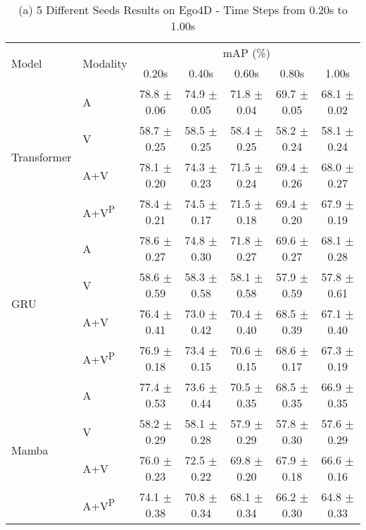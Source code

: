 \begin{table*}[t]
\centering
\footnotesize

\begin{subtable}{\textwidth}
\centering
\begin{adjustbox}{width=\textwidth, center}
\begin{tabular}{llccccc}
\toprule
\multirow{2}{*}{Model} & \multirow{2}{*}{Modality} & \multicolumn{5}{c}{mAP (\%)} \\
\cmidrule(lr){3-7}
 & & 0.20s & 0.40s & 0.60s & 0.80s & 1.00s \\
\midrule
\multirow{4}{*}{\centering Transformer} 
 & A & 78.8 $\pm$ 0.06 & 74.9 $\pm$ 0.05 & 71.8 $\pm$ 0.04 & 69.7 $\pm$ 0.05 & 68.1 $\pm$ 0.02 
 \\
 & V & 58.7 $\pm$ 0.25 & 58.5 $\pm$ 0.25 & 58.4 $\pm$ 0.25 & 58.2 $\pm$ 0.24 & 58.1 $\pm$ 0.24 
 \\
 & A+V & 78.1 $\pm$ 0.20 & 74.3 $\pm$ 0.23 & 71.5 $\pm$ 0.24 & 69.4 $\pm$ 0.26 & 68.0 $\pm$ 0.27 
 \\
 & A+V\textsuperscript{P} & 78.4 $\pm$ 0.21 & 74.5 $\pm$ 0.17 & 71.5 $\pm$ 0.18 & 69.4 $\pm$ 0.20 & 67.9 $\pm$ 0.19 
 \\
\midrule
\multirow{4}{*}{\centering GRU} 
 & A & 78.6 $\pm$ 0.27 & 74.8 $\pm$ 0.30 & 71.8 $\pm$ 0.27 & 69.6 $\pm$ 0.27 & 68.1 $\pm$ 0.28 
 \\
 & V & 58.6 $\pm$ 0.59 & 58.3 $\pm$ 0.58 & 58.1 $\pm$ 0.58 & 57.9 $\pm$ 0.59 & 57.8 $\pm$ 0.61 
 \\
 & A+V & 76.4 $\pm$ 0.41 & 73.0 $\pm$ 0.42 & 70.4 $\pm$ 0.40 & 68.5 $\pm$ 0.39 & 67.1 $\pm$ 0.40 
 \\
 & A+V\textsuperscript{P} & 76.9 $\pm$ 0.18 & 73.4 $\pm$ 0.15 & 70.6 $\pm$ 0.15 & 68.6 $\pm$ 0.17 & 67.3 $\pm$ 0.19 
 \\
\midrule
\multirow{4}{*}{\centering Mamba} 
 & A & 77.4 $\pm$ 0.53 & 73.6 $\pm$ 0.44 & 70.5 $\pm$ 0.35 & 68.5 $\pm$ 0.35 & 66.9 $\pm$ 0.35 
 \\
 & V & 58.2 $\pm$ 0.29 & 58.1 $\pm$ 0.28 & 57.9 $\pm$ 0.29 & 57.8 $\pm$ 0.30 & 57.6 $\pm$ 0.29 
 \\
 & A+V & 76.0 $\pm$ 0.23 & 72.5 $\pm$ 0.22 & 69.8 $\pm$ 0.20 & 67.9 $\pm$ 0.18 & 66.6 $\pm$ 0.16 
 \\
 & A+V\textsuperscript{P} & 74.1 $\pm$ 0.38 & 70.8 $\pm$ 0.34 & 68.1 $\pm$ 0.34 & 66.2 $\pm$ 0.30 & 64.8 $\pm$ 0.33 
 \\
\bottomrule
\end{tabular}
\end{adjustbox}
\label{tab:timesteps_different_seeds_Ego4D_a}
\caption*{(a) 5 Different Seeds Results on Ego4D - Time Steps from 0.20s to 1.00s}
\end{subtable}



\end{table*}
